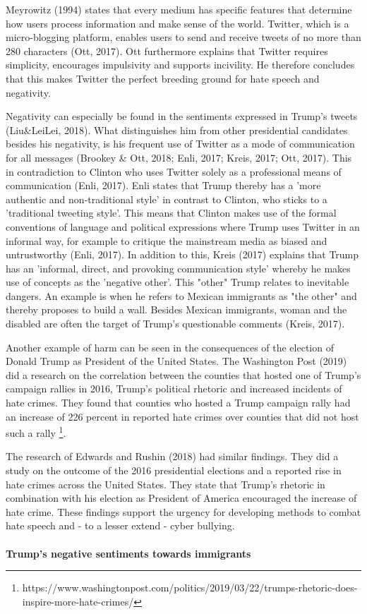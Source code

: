 \documentclass[a4paper,pdf]{article} %
\begin{document}
Meyrowitz (1994) states that every medium has specific features that determine how users process information and make sense of the world. Twitter, which is a micro-blogging platform, enables users to send and receive tweets of no more than 280 characters (Ott, 2017). Ott furthermore explains that Twitter requires simplicity, encourages impulsivity and supports incivility. He therefore concludes that this makes Twitter the perfect breeding ground for hate speech and negativity.

Negativity can especially be found in the sentiments expressed in Trump's tweets (Liu\&LeiLei, 2018). What distinguishes him from other presidential candidates besides his negativity, is his frequent use of Twitter as a mode of communication for all messages (Brookey \& Ott, 2018; Enli, 2017; Kreis, 2017; Ott, 2017). This in contradiction to Clinton who uses Twitter solely as a professional means of communication (Enli, 2017). Enli states that Trump thereby has a 'more authentic and non-traditional style' in contrast to Clinton, who sticks to a 'traditional tweeting style'. This means that Clinton makes use of the formal conventions of language and political expressions where Trump uses Twitter in an informal way, for example to critique the mainstream media as biased and untrustworthy (Enli, 2017). In addition to this, Kreis (2017) explains that Trump has an 'informal, direct, and provoking communication style' whereby he makes use of concepts as the 'negative other'. This "other" Trump relates to inevitable dangers. An example is when he refers to Mexican immigrants as "the other" and thereby proposes to build a wall. Besides Mexican immigrants, woman and the disabled are often the target of Trump's questionable comments (Kreis, 2017).  

Another example of harm can be seen in the consequences of the election of Donald Trump as President of the United States. The Washington Post (2019) did a research on the correlation between the counties that hosted one of Trump's campaign rallies in 2016, Trump's political rhetoric and increased incidents of hate crimes. They found that counties who hosted a Trump campaign rally had an increase of 226 percent in reported hate crimes over counties that did not host such a rally \footnote{https://www.washingtonpost.com/politics/2019/03/22/trumps-rhetoric-does-inspire-more-hate-crimes/}.

The research of Edwards and Rushin (2018) had similar findings. They did a study on the outcome of the 2016 presidential elections and a reported rise in hate crimes across the United States. They state that Trump's rhetoric in combination with his election as President of America encouraged the increase of hate crime. These findings support the urgency for developing methods to combat hate speech and - to a lesser extend - cyber bullying.\\
\break \\
\textbf{Trump's negative sentiments towards immigrants}\\
\end{document}
